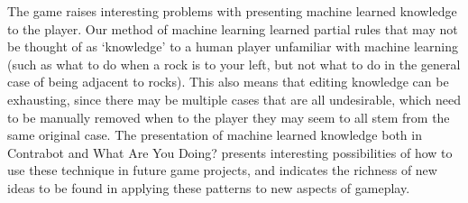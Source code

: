 \documentclass{sig-alternate}
\begin{document}
The game raises interesting problems with presenting machine
learned knowledge to the player. Our method of machine learning
learned partial rules that may not be thought of as ‘knowledge’ to
a human player unfamiliar with machine learning (such as what to
do when a rock is to your left, but not what to do in the general
case of being adjacent to rocks). This also means that editing
knowledge can be exhausting, since there may be multiple cases
that are all undesirable, which need to be manually removed when
to the player they may seem to all stem from the same original
case. The presentation of machine learned knowledge both in
Contrabot and What Are You Doing? presents interesting
possibilities of how to use these technique in future game projects,
and indicates the richness of new ideas to be found in applying
these patterns to new aspects of gameplay.

\cite{smith2012:endlessweb}



\end{document}
